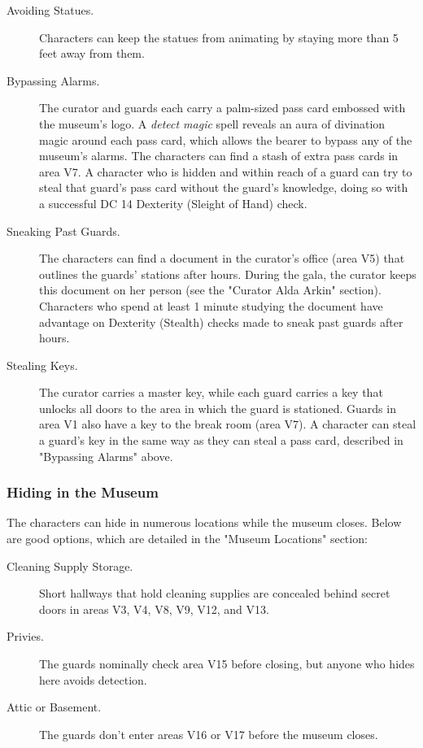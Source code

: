 \documentclass[10pt,a4paper,twoside,bg=print,twocolumn,openany,nodeprecatedcode]{dndbook}
\begin{document}
\begin{description}
\item[Avoiding Statues.]
Characters can keep the statues from animating by staying more than 5 feet away from them.
\item[Bypassing Alarms.]
The curator and guards each carry a palm-sized pass card embossed with the museum's logo. A \textit{detect magic} spell reveals an aura of divination magic around each pass card, which allows the bearer to bypass any of the museum's alarms. The characters can find a stash of extra pass cards in area V7. A character who is hidden and within reach of a guard can try to steal that guard's pass card without the guard's knowledge, doing so with a successful DC 14 Dexterity (Sleight of Hand) check.
\item[Sneaking Past Guards.]
The characters can find a document in the curator's office (area V5) that outlines the guards' stations after hours. During the gala, the curator keeps this document on her person (see the "Curator Alda Arkin" section). Characters who spend at least 1 minute studying the document have advantage on Dexterity (Stealth) checks made to sneak past guards after hours.
\item[Stealing Keys.]
The curator carries a master key, while each guard carries a key that unlocks all doors to the area in which the guard is stationed. Guards in area V1 also have a key to the break room (area V7). A character can steal a guard's key in the same way as they can steal a pass card, described in "Bypassing Alarms" above.
\end{description}

\subsubsection{Hiding in the Museum}
The characters can hide in numerous locations while the museum closes. Below are good options, which are detailed in the "Museum Locations" section:


\begin{description}
\item[Cleaning Supply Storage.]
Short hallways that hold cleaning supplies are concealed behind secret doors in areas V3, V4, V8, V9, V12, and V13.
\item[Privies.]
The guards nominally check area V15 before closing, but anyone who hides here avoids detection.
\item[Attic or Basement.]
The guards don't enter areas V16 or V17 before the museum closes.
\end{description}
\end{document}
